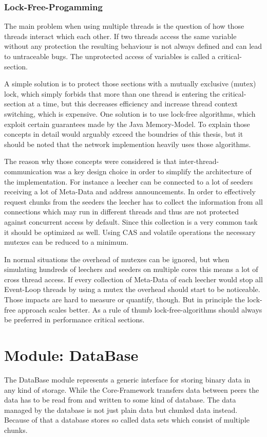\subsubsection{Lock-Free-Progamming}
\label{subsecsec:lockfree}
The main problem when using multiple threads is the question of how those threads interact which each other. If two threads access the same variable without any protection the resulting behaviour is not always defined and can lead to untraceable bugs. The unprotected access of variables is called a critical-section.

A simple solution is to protect those sections with a mutually exclusive (mutex) lock, which simply forbids that more than one thread is entering the critical-section at a time, but this decreases efficiency and increase thread context switching, which is expensive. One solution is to use lock-free algorithms, which exploit certain guarantees made by the Java Memory-Model. To explain those concepts in detail would arguably exceed the boundries of this thesis, but it should be noted that the network implemention heavily uses those algorithms.

The reason why those concepts were considered is that inter-thread-communication was a key design choice in order to simplify the architecture of the implementation. For instance a leecher can be connected to a lot of seeders receiving a lot of Meta-Data and address announcements. In order to effectively request chunks from the seeders the leecher has to collect the information from all connections which may run in different threads and thus are not protected against concurrent access by default. Since this collection is a very common task it should be optimized as well. Using CAS and volatile operations the necessary mutexes can be reduced to a minimum. 

In normal situations the overhead of mutexes can be ignored, but when simulating hundreds of leechers and seeders on multiple cores this means a lot of cross thread access. If every collection of Meta-Data of each leecher would stop all Event-Loop threads by using a mutex the overhead should start to be noticeable. Those impacts are hard to measure or quantify, though. But in principle the lock-free approach scales better. As a rule of thumb lock-free-algorithms should always be preferred in performance critical sections.

\cleardoublepage
\section{Module: DataBase}
\label{sec:database}
The DataBase module represents a generic interface for storing binary data in any kind of storage. While the Core-Framework transfers data between peers the data has to be read from and written to some kind of database. The data managed by the database is not just plain data but chunked data instead. Because of that a database stores so called data sets which consist of multiple chunks. 

